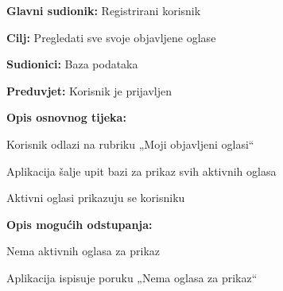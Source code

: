 				\noindent {}
				\begin{packed_item}
					
					\item \textbf{Glavni sudionik: }Registrirani korisnik
					\item  \textbf{Cilj:} Pregledati sve svoje objavljene oglase  
					\item  \textbf{Sudionici:} Baza podataka
					\item  \textbf{Preduvjet:} Korisnik je prijavljen
					\item  \textbf{Opis osnovnog tijeka:}
					
					\item[] \begin{packed_enum}
						\item Korisnik odlazi na rubriku „Moji objavljeni oglasi“
						\item Aplikacija šalje upit bazi za prikaz svih aktivnih oglasa
						\item Aktivni oglasi prikazuju se korisniku
					\end{packed_enum}
					
					\item  \textbf{Opis mogućih odstupanja:}
					
					\item[] \begin{packed_item}
						
						\item[2.a] Nema aktivnih oglasa za prikaz
						\item[] \begin{packed_enum}
							\item Aplikacija ispisuje poruku „Nema oglasa za prikaz“ 
						\end{packed_enum}
						
					\end{packed_item}
				\end{packed_item}
				
